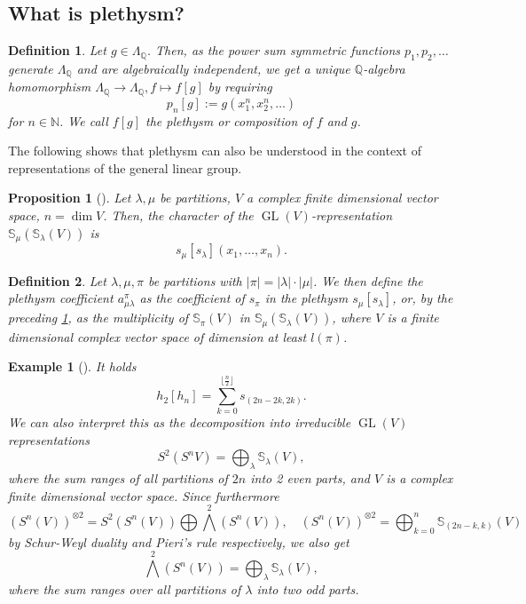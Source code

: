 \documentclass[a4paper]{amsart}
\newtheorem{proposition}{Proposition}
\newtheorem{example}{Example}
\newtheorem{definition}{Definition}
\def\N{{\mathbb{N}}}
\def\Q{{\mathbb{Q}}}
\DeclareMathOperator{\GL}{\mathrm{GL}}
\newcommand{\abs}[1]{\left| #1\right|}
\begin{document}
\subsection{What is plethysm?}
\begin{definition}
	Let $g\in\Lambda_\Q$.
	Then, as the power sum symmetric functions $p_1,p_2,\ldots$ generate $\Lambda_\Q$ and are algebraically independent, we get a unique $\Q$-algebra homomorphism $\Lambda_\Q\to\Lambda_\Q,f\mapsto f[g]$ by requiring
	\begin{displaymath}
		p_n[g]:=g(x_1^n,x_2^n,\ldots)
	\end{displaymath}
	for $n\in\N$.
	We call $f[g]$ the \textit{plethysm} or \textit{composition} of $f$ and $g$.
\end{definition}
The following shows that plethysm can also be understood in the context of representations of the general linear group.
\begin{proposition}[{\cite[p. 448]{Sta99}}]\label{plethysm:prop1}
	Let $\lambda,\mu$ be partitions, $V$ a complex finite dimensional vector space, $n=\dim V$.
	Then, the character of the $\GL(V)$-representation $\mathbb{S}_\mu(\mathbb{S}_\lambda(V))$ is 
	\begin{displaymath}
	s_\mu[s_\lambda](x_1,\ldots, x_{n}).
	\end{displaymath}
\end{proposition}
\begin{definition}\label{def:a}
	Let $\lambda,\mu,\pi$ be partitions with $\abs{\pi}=\abs{\lambda}\cdot\abs{\mu}$.
	We then define the \textit{plethysm coefficient} $a_{\mu\lambda}^\pi$ as the coefficient of $s_\pi$ in the plethysm $s_\mu[s_\lambda]$,
	or, by the preceding \cref{plethysm:prop1}, as the multiplicity of $\mathbb{S}_\pi(V)$ in $\mathbb{S}_\mu(\mathbb{S}_\lambda(V))$,
	where $V$ is a finite dimensional complex vector space of dimension at least $l(\pi)$.
\end{definition}
\begin{example}[{\cite[I.8, Ex. 9]{Mac98}}]\label{plethysm:ex1}
	It holds
	\begin{displaymath}
		h_2[h_n]=\sum\limits_{k=0}^{\lfloor\frac{n}{2}\rfloor}s_{(2n-2k,2k)}.
	\end{displaymath}
	We can also interpret this as the decomposition into irreducible $\GL(V)$ representations
	\begin{displaymath}
		S^2(S^n V)=\bigoplus_{\lambda}\mathbb{S}_\lambda(V),
	\end{displaymath}
	where the sum ranges of all partitions of $2n$ into 2 even parts, and $V$ is a complex finite dimensional vector space.
	Since furthermore
	\begin{displaymath}
		(S^n(V))^{\otimes 2}=S^2(S^n(V))\bigoplus\bigwedge^2(S^n(V)),\quad
		(S^n(V))^{\otimes 2}=\bigoplus_{k=0}^n\mathbb{S}_{(2n-k,k)}(V)
	\end{displaymath}
	by Schur-Weyl duality and Pieri's rule respectively,
	we also get
	\begin{displaymath}
		\bigwedge^2(S^n(V))=\bigoplus_{\lambda}\mathbb{S}_\lambda(V),
	\end{displaymath}
	where the sum ranges over all partitions of $\lambda$ into two odd parts.
\end{example}
\end{document}
